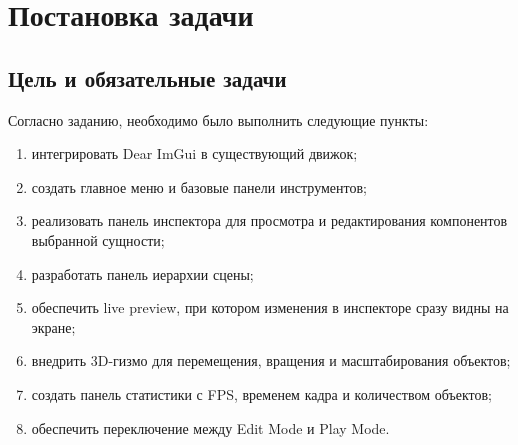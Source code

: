\documentclass[a4paper,14pt]{extarticle}
\begin{document}
\section{Постановка задачи}
\subsection{Цель и обязательные задачи}
Согласно заданию, необходимо было выполнить следующие пункты:
\begin{enumerate}
  \item интегрировать Dear ImGui в существующий движок;
  \item создать главное меню и базовые панели инструментов;
  \item реализовать панель инспектора для просмотра и редактирования компонентов выбранной сущности;
  \item разработать панель иерархии сцены;
  \item обеспечить live preview, при котором изменения в инспекторе сразу видны на экране;
  \item внедрить 3D-гизмо для перемещения, вращения и масштабирования объектов;
  \item создать панель статистики с FPS, временем кадра и количеством объектов;
  \item обеспечить переключение между Edit Mode и Play Mode.
\end{enumerate}
\end{document}
